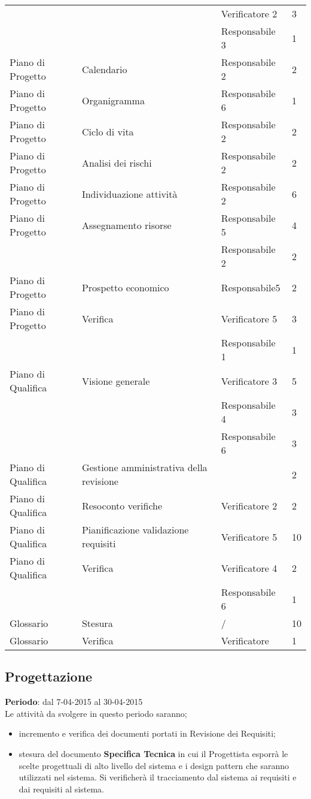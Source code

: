 {{\begin{longtable} [c]{| l | l | l | l |}
		&	&	Verificatore 2 & 3\\
		&	&	Responsabile 3 & 1\\
		Piano di Progetto & Calendario & Responsabile 2 & 2\\
		Piano di Progetto & Organigramma & Responsabile 6 & 1\\
		Piano di Progetto & Ciclo di vita & Responsabile 2 & 2\\
		Piano di Progetto & Analisi dei rischi & Responsabile 2 & 2\\
		Piano di Progetto & Individuazione attivit\`{a} & Responsabile 2 & 6\\
		Piano di Progetto & Assegnamento risorse & Responsabile 5 & 4\\
		&	&	Responsabile 2 & 2\\
		Piano di Progetto & Prospetto economico & Responsabile5 & 2\\
		Piano di Progetto & Verifica &  Verificatore 5 & 3\\
		&	&	Responsabile 1 & 1\\
		Piano di Qualifica & Visione generale & Verificatore 3 & 5\\
		&	&	Responsabile 4 & 3\\
		&	&	Responsabile 6 & 3\\
		Piano di Qualifica & Gestione amministrativa della revisione & & 2\\
		Piano di Qualifica & Resoconto verifiche & Verificatore 2 & 2\\
		Piano di Qualifica & Pianificazione validazione requisiti & Verificatore 5 & 10\\
		Piano di Qualifica & Verifica & Verificatore 4 & 2\\
		&	&	Responsabile 6 & 1\\
		Glossario & Stesura & / & 10\\
		Glossario & Verifica & Verificatore & 1\\
	\end{longtable}
}
\subsection{Progettazione}{
	\textbf{Periodo}: dal 7-04-2015 al 30-04-2015 \\
	
	Le attivit\`{a} da svolgere in questo periodo saranno;
	\begin{itemize}
		\item incremento e verifica dei documenti portati in Revisione dei Requisiti;
		\item stesura del documento \textbf{Specifica Tecnica} in cui il Progettista esporr\`{a} le scelte progettuali di alto livello del sistema e i design pattern che saranno utilizzati nel sistema. Si verificher\`{a} il tracciamento dal sistema ai requisiti e dai requisiti al sistema.
	\end{itemize}
	
}}
